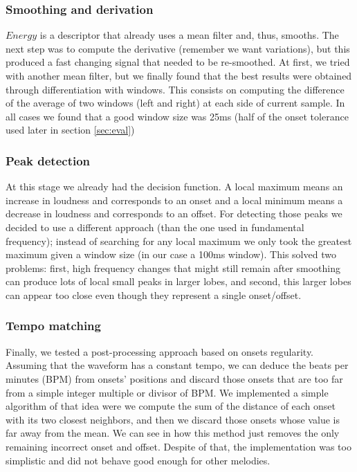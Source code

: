 \documentclass{article}
\begin{document}
\subsubsection{Smoothing and derivation}
${Energy}$ is a descriptor that already uses a mean filter and, thus, smooths.
The next step was to compute the derivative (remember we want variations), but this produced a fast changing signal that needed to be re-smoothed.
At first, we tried with another mean filter, but we finally found that the best results were obtained through differentiation with windows.
This consists on computing the difference of the average of two windows (left and right) at each side of current sample.
In all cases we found that a good window size was 25ms (half of the onset tolerance used later in section \ref{sec:eval})

\subsubsection{Peak detection}\label{subsec:energy_peaks}
At this stage we already had the decision function.
A local maximum means an increase in loudness and corresponds to an onset and
a local minimum means a decrease in loudness and corresponds to an offset.
For detecting those peaks we decided to use a different approach (than the one used in fundamental frequency);
instead of searching for any local maximum we only took the greatest maximum given a window size (in our case a 100ms window).
This solved two problems: first, high frequency changes that might still remain after smoothing can produce lots of local small peaks
in larger lobes, and second, this larger lobes can appear too close even though they represent a single onset/offset.

\subsubsection{Tempo matching}
Finally, we tested a post-processing approach based on onsets regularity.
Assuming that the waveform has a constant tempo, we can deduce the beats per minutes (BPM) from onsets' positions 
and discard those onsets that are too far from a simple integer multiple or divisor of BPM.
We implemented a simple algorithm of that idea were we compute the sum of the distance of each onset with its two closest neighbors,
and then we discard those onsets whose value is far away from the mean.
We can see in  how this method just removes the only remaining incorrect onset and offset.
Despite of that, the implementation was too simplistic and did not behave good enough for other melodies.
\end{document}
